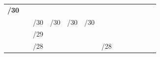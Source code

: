 \documentclass[11pt,a4paper]{report}
\begin{document}
\begin{center}
\begin{longtable}{rlcccccccccccccccc}
            \textbf{/30}                                                                                             &                       & \cellcolor[HTML]{C09FE5}  & \cellcolor[HTML]{C09FE5}  &                           &                           &                           &                            &                            &                            &                                 &                                 &                                 &                                 &                                 &                                 &                                  &                                 \\ \cline{1-1} \cline{3-18}
                                                                                                                     & \multicolumn{1}{l|}{} & \multicolumn{2}{l}{\cellcolor[HTML]{C09FE5}/30}       & \multicolumn{2}{c}{\cellcolor[HTML]{C09FE5}/30}       & \multicolumn{2}{c}{\cellcolor[HTML]{C09FE5}/30}        & \multicolumn{2}{c}{\cellcolor[HTML]{C09FE5}/30}         & \multicolumn{2}{c}{\cellcolor[HTML]{BFBFBF}}                      & \multicolumn{2}{c}{\cellcolor[HTML]{FFD966}}                      & \multicolumn{2}{c}{\cellcolor[HTML]{A9D08E}}                      & \multicolumn{2}{c|}{\cellcolor[HTML]{F4B084}}                      \\
                                                                                                                     & \multicolumn{1}{l|}{} & \multicolumn{4}{l}{/29}                                                                                       & \multicolumn{4}{c}{}                                                                                             & \multicolumn{2}{c}{\cellcolor[HTML]{BFBFBF}}                      & \multicolumn{2}{c}{\cellcolor[HTML]{FFD966}}                      & \multicolumn{2}{c}{\cellcolor[HTML]{A9D08E}}                      & \multicolumn{2}{c|}{\cellcolor[HTML]{F4B084}}                      \\
                                                                                                                     & \multicolumn{1}{l|}{} & \multicolumn{8}{l}{\cellcolor[HTML]{BFBFBF}/28}                                                                                                                                                                                  & \multicolumn{2}{c}{\multirow{-3}{*}{\cellcolor[HTML]{BFBFBF}/28}} & \multicolumn{2}{c}{\cellcolor[HTML]{FFD966}}                      & \multicolumn{2}{c}{\cellcolor[HTML]{A9D08E}}                      & \multicolumn{2}{c|}{\cellcolor[HTML]{F4B084}}                      \\

\end{longtable}
\end{center}
\end{document}

